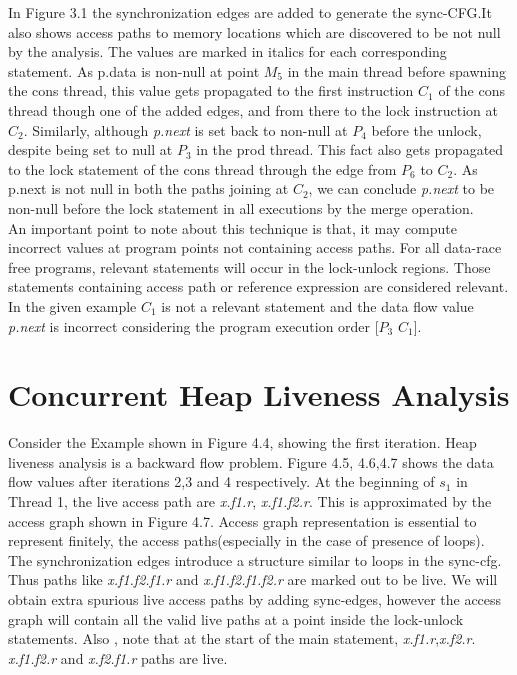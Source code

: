 In Figure 3.1 the synchronization edges are added to generate the sync-CFG.It also shows access paths to memory locations which are discovered to be not null by the analysis. The values are marked in italics for each corresponding statement. As p.data is non-null at point $M_5$ in the main thread before spawning the cons thread, this value gets propagated to the first instruction $C_1$ of the cons thread though one of the added edges, and from there to the lock instruction at $C_2$. Similarly, although \emph{p.next} is set back to non-null at $P_4$ before the unlock, despite being set to
null at $P_3$ in the prod thread. This fact also gets propagated to the lock statement of the cons thread through the edge from $P_6$ to $C_2$. As p.next is not null in both the paths joining at $C_2$, we can conclude \emph{p.next} to be non-null before the lock statement in all executions by the merge operation. \\

An important point to note about this technique is that, it may compute incorrect values at program points not containing access paths. For all data-race free programs, relevant statements will occur in the lock-unlock regions. Those statements containing access path or reference expression are considered relevant. In the given example $C_1$ is not a relevant statement and the data flow value \emph{p.next} is incorrect considering the program execution order [$P_3$ $C_1$]. %

\section{Concurrent Heap Liveness Analysis}

Consider the Example shown in Figure 4.4, showing the first iteration. Heap  liveness analysis is a backward flow problem. Figure 4.5, 4.6,4.7 shows the data flow values after iterations 2,3 and 4 respectively. At the beginning of $s_1$ in Thread 1, the live access path are \emph{x.f1.r}, \emph{x.f1.f2.r}. This is approximated by the access graph shown in Figure 4.7. Access graph representation is essential to represent finitely, the access paths(especially in the case of presence of loops). The synchronization edges introduce a structure similar to loops in the sync-cfg. Thus paths like \emph{x.f1.f2.f1.r} and \emph{x.f1.f2.f1.f2.r} are marked out to be live. We will obtain extra spurious live access paths by adding sync-edges, however the access graph will contain all the valid live paths at a point inside the lock-unlock statements. Also , note that at the start of the main statement, \emph{x.f1.r},\emph{x.f2.r}. \emph{x.f1.f2.r} and \emph{x.f2.f1.r} paths are live.\\

